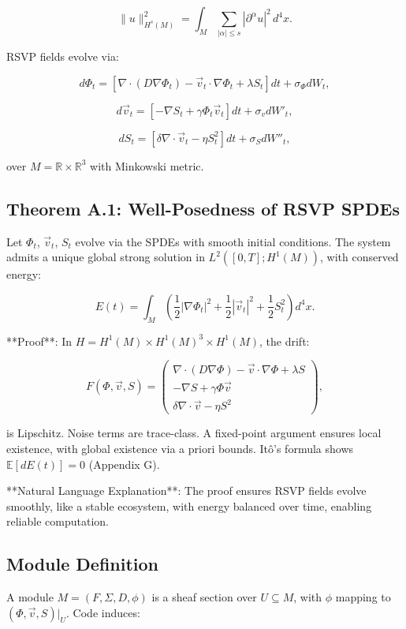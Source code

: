 \documentclass[12pt]{article}
\begin{document}
\[
\|u\|_{H^s(M)}^2 = \int_M \sum_{|\alpha| \leq s} |\partial^\alpha u|^2 \, d^4x.
\]

RSVP fields evolve via:

\[
d\Phi_t = \left[ \nabla \cdot (D \nabla \Phi_t) - \vec{v}_t \cdot \nabla \Phi_t + \lambda S_t \right] dt + \sigma_\Phi dW_t,
\]

\[
d\vec{v}_t = \left[ -\nabla S_t + \gamma \Phi_t \vec{v}_t \right] dt + \sigma_v dW'_t,
\]

\[
dS_t = \left[ \delta \nabla \cdot \vec{v}_t - \eta S_t^2 \right] dt + \sigma_S dW''_t,
\]

over $M = \mathbb{R} \times \mathbb{R}^3$ with Minkowski metric.

\subsection{Theorem A.1: Well-Posedness of RSVP SPDEs}
Let $\Phi_t$, $\vec{v}_t$, $S_t$ evolve via the SPDEs with smooth initial conditions. The system admits a unique global strong solution in $L^2([0,T]; H^1(M))$, with conserved energy:

\[
E(t) = \int_M \left( \frac{1}{2} |\nabla \Phi_t|^2 + \frac{1}{2} |\vec{v}_t|^2 + \frac{1}{2} S_t^2 \right) d^4x.
\]

**Proof**: In $H = H^1(M) \times H^1(M)^3 \times H^1(M)$, the drift:

\[
F(\Phi, \vec{v}, S) = \begin{pmatrix}
\nabla \cdot (D \nabla \Phi) - \vec{v} \cdot \nabla \Phi + \lambda S \\
-\nabla S + \gamma \Phi \vec{v} \\
\delta \nabla \cdot \vec{v} - \eta S^2
\end{pmatrix},
\]

is Lipschitz. Noise terms are trace-class. A fixed-point argument ensures local existence, with global existence via a priori bounds. Itô’s formula shows $\mathbb{E}[dE(t)] = 0$ \cite{daprato2014stochastic} (Appendix G).

**Natural Language Explanation**: The proof ensures RSVP fields evolve smoothly, like a stable ecosystem, with energy balanced over time, enabling reliable computation.

\subsection{Module Definition}
A module $M = (F, \Sigma, D, \phi)$ is a sheaf section over $U \subseteq M$, with $\phi$ mapping to $(\Phi, \vec{v}, S)|_U$. Code induces:
\end{document}

